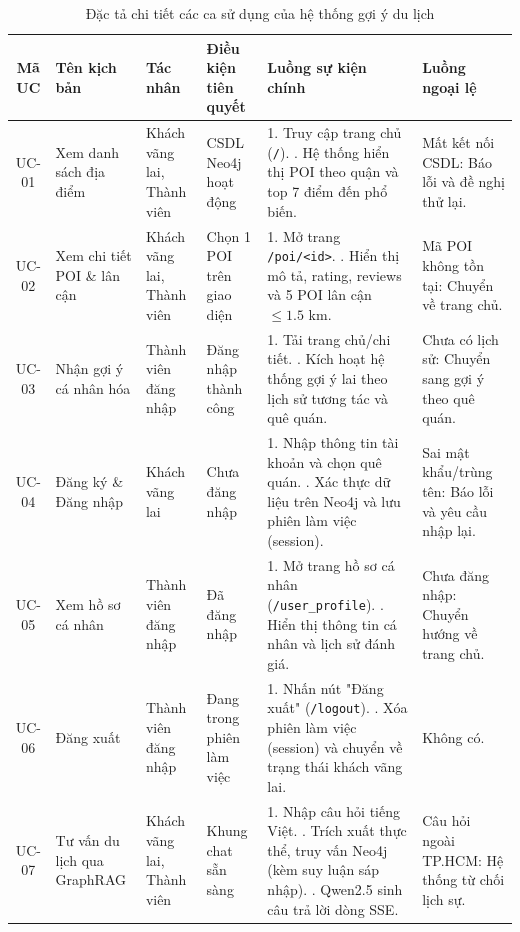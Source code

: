 \documentclass[journal,onecolumn,10pt]{IEEEtran}
\newcommand{\code}[1]{\texttt{#1}}
\begin{document}
\begin{table}[H]
\centering
\caption{Đặc tả chi tiết các ca sử dụng của hệ thống gợi ý du lịch}
\label{tab:usecases}
\footnotesize
\setlength{\tabcolsep}{4pt}
\begin{tabular}{cp{1.8cm}p{1.8cm}p{2.5cm}p{5.0cm}p{3.2cm}}
\toprule
\textbf{Mã UC} & \textbf{Tên kịch bản} & \textbf{Tác nhân} & \textbf{Điều kiện tiên quyết} & \textbf{Luồng sự kiện chính} & \textbf{Luồng ngoại lệ} \\
\midrule
UC-01 & Xem danh sách địa điểm & Khách vãng lai, Thành viên & CSDL Neo4j hoạt động & 1. Truy cập trang chủ (\code{/}). \newline 2. Hệ thống hiển thị POI theo quận và top 7 điểm đến phổ biến. & Mất kết nối CSDL: Báo lỗi và đề nghị thử lại. \\
\midrule
UC-02 & Xem chi tiết POI \& lân cận & Khách vãng lai, Thành viên & Chọn 1 POI trên giao diện & 1. Mở trang \code{/poi/<id>}. \newline 2. Hiển thị mô tả, rating, reviews và 5 POI lân cận $\le 1.5$ km. & Mã POI không tồn tại: Chuyển về trang chủ. \\
\midrule
UC-03 & Nhận gợi ý cá nhân hóa & Thành viên đăng nhập & Đăng nhập thành công & 1. Tải trang chủ/chi tiết. \newline 2. Kích hoạt hệ thống gợi ý lai theo lịch sử tương tác và quê quán. & Chưa có lịch sử: Chuyển sang gợi ý theo quê quán. \\
\midrule
UC-04 & Đăng ký \& Đăng nhập & Khách vãng lai & Chưa đăng nhập & 1. Nhập thông tin tài khoản và chọn quê quán. \newline 2. Xác thực dữ liệu trên Neo4j và lưu phiên làm việc (session). & Sai mật khẩu/trùng tên: Báo lỗi và yêu cầu nhập lại. \\
\midrule
UC-05 & Xem hồ sơ cá nhân & Thành viên đăng nhập & Đã đăng nhập & 1. Mở trang hồ sơ cá nhân (\code{/user\_profile}). \newline 2. Hiển thị thông tin cá nhân và lịch sử đánh giá. & Chưa đăng nhập: Chuyển hướng về trang chủ. \\
\midrule
UC-06 & Đăng xuất & Thành viên đăng nhập & Đang trong phiên làm việc & 1. Nhấn nút "Đăng xuất" (\code{/logout}). \newline 2. Xóa phiên làm việc (session) và chuyển về trạng thái khách vãng lai. & Không có. \\
\midrule
UC-07 & Tư vấn du lịch qua GraphRAG & Khách vãng lai, Thành viên & Khung chat sẵn sàng & 1. Nhập câu hỏi tiếng Việt. \newline 2. Trích xuất thực thể, truy vấn Neo4j (kèm suy luận sáp nhập). \newline 3. Qwen2.5 sinh câu trả lời dòng SSE. & Câu hỏi ngoài TP.HCM: Hệ thống từ chối lịch sự. \\
\bottomrule
\end{tabular}
\end{table}
\end{document}

